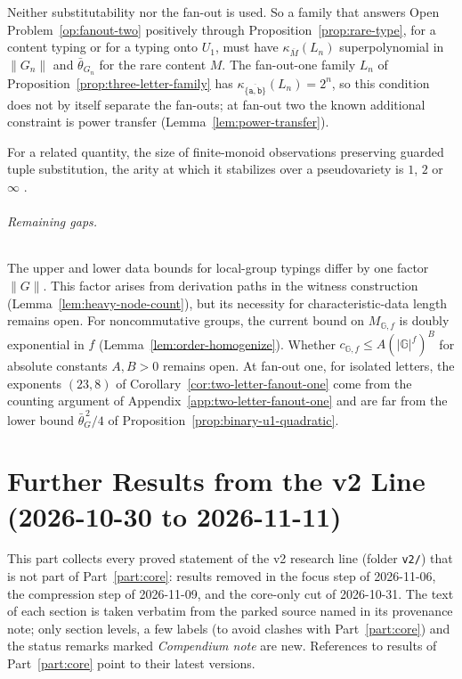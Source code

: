 \documentclass[11pt]{article}
\numberwithin{equation}{section}
\theoremstyle{plain}
\theoremstyle{definition}
\theoremstyle{remark}
\theoremstyle{plain}
\begin{document}
Neither substitutability nor the fan-out is used.  So a family that answers
Open Problem~\ref{op:fanout-two} positively through
Proposition~\ref{prop:rare-type}, for a content typing or for a typing onto
$U_1$, must have $\kappa_{\overline M}(L_n)$ superpolynomial in $\|G_n\|$ and
$\bar\theta_{G_n}$ for the rare content $M$.  The fan-out-one family $L_n$ of
Proposition~\ref{prop:three-letter-family} has $\kappa_{\overline{\{\mathtt a,\mathtt b\}}}(L_n)=2^n$,
so this condition does not by itself separate the fan-outs; at fan-out two the
known additional constraint is power transfer
(Lemma~\ref{lem:power-transfer}).

For a related quantity, the size of finite-monoid observations preserving
guarded tuple substitution, the arity at which it stabilizes over a
pseudovariety is $1$, $2$ or $\infty$ \cite{KuriyamaSCL2026}.


\paragraph{Remaining gaps.}
The upper and lower data bounds for local-group
typings differ by one factor $\|G\|$. This factor
arises from derivation paths in the witness construction
(Lemma~\ref{lem:heavy-node-count}), but its necessity
for characteristic-data length remains open.
For noncommutative groups, the current bound on
$M_{\mathbb G,f}$ is doubly exponential in $f$
(Lemma~\ref{lem:order-homogenize}).
Whether $c_{\mathbb G,f}\le A(|\mathbb G|^f)^B$
for absolute constants $A,B>0$ remains open.
At fan-out one, for isolated letters, the exponents
$(23,8)$ of Corollary~\ref{cor:two-letter-fanout-one} come from the counting
argument of Appendix~\ref{app:two-letter-fanout-one} and are far from the lower
bound $\bar\theta_G^{\,2}/4$ of Proposition~\ref{prop:binary-u1-quadratic}.


\part{Further Results from the v2 Line (2026-10-30 to 2026-11-11)}
\label{part:v2-further}

This part collects every proved statement of the v2 research line (folder \texttt{v2/}) that is not
part of Part~\ref{part:core}: results removed in the focus step of 2026-11-06, the compression
step of 2026-11-09, and the core-only cut of 2026-10-31.  The text of each section is taken verbatim
from the parked source named in its provenance note; only section levels, a few labels (to avoid
clashes with Part~\ref{part:core}) and the status remarks marked \emph{Compendium note} are new.
References to results of Part~\ref{part:core} point to their latest versions.
\end{document}
